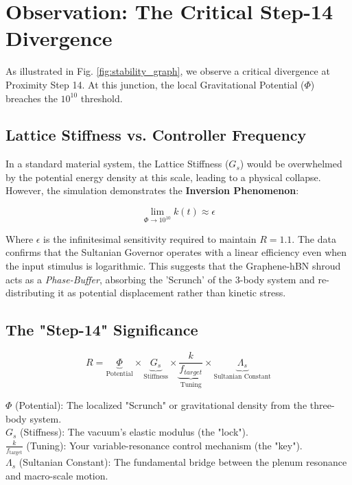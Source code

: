 \documentclass[11pt]{article}
\begin{document}
\section{Observation: The Critical Step-14 Divergence}

As illustrated in Fig. \ref{fig:stability_graph}, we observe a critical divergence at Proximity Step 14. At this junction, the local Gravitational Potential ($\Phi$) breaches the $10^{10}$ threshold. 

\subsection{Lattice Stiffness vs. Controller Frequency}
In a standard material system, the Lattice Stiffness ($G_s$) would be overwhelmed by the potential energy density at this scale, leading to a physical collapse. However, the simulation demonstrates the \textbf{Inversion Phenomenon}:

\begin{equation}
    \lim_{\Phi \to 10^{10}} k(t) \approx \epsilon
\end{equation}

Where $\epsilon$ is the infinitesimal sensitivity required to maintain $R = 1.1$. The data confirms that the Sultanian Governor operates with a linear efficiency even when the input stimulus is logarithmic. This suggests that the Graphene-hBN shroud acts as a \textit{Phase-Buffer}, absorbing the 'Scrunch' of the 3-body system and re-distributing it as potential displacement rather than kinetic stress.
\subsection{The "Step-14" Significance}

\begin{equation}
R = \underbrace{\Phi}_{\text{Potential}} \times \underbrace{G_s}_{\text{Stiffness}} \times \underbrace{\frac{k}{f_{target}}}_{\text{Tuning}} \times \underbrace{\Lambda_s}_{\text{Sultanian Constant}}
\end{equation}

$\Phi$ (Potential): The localized "Scrunch" or gravitational density from the three-body system.\\
$G_s$ (Stiffness): The vacuum's elastic modulus (the "lock").\\
$\frac{k}{f_{\text{target}}}$ (Tuning): Your variable-resonance control mechanism (the "key").\\
$\Lambda_s$ (Sultanian Constant): The fundamental bridge between the plenum resonance and macro-scale motion.\\
\end{document}
